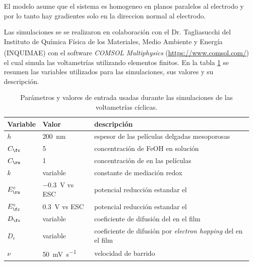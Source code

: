	     El modelo asume que el sistema es homogeneo en planos paralelos al electrodo y por lo tanto hay gradientes solo en la direccion normal al electrodo.   


	 	 Las simulaciones se se realizaron en colaboración con el Dr. Tagliasucchi del Instituto de Química Física de los Materiales, Medio Ambiente y Energía (INQUIMAE) con el software \textit{COMSOL Multiphysics\textsuperscript\textregistered} (\url{https://www.comsol.com/}) el cual simula las voltametrías utilizando elementos finitos. En la tabla \ref{tabla:simulacion} se resumen las variables utilizados para las simulaciones, sus valores y su descripción.
	 	
	    	\begin{table}[ht!]
	 	    \caption[Parámetros de las simulacinoes]{Parámetros y valores de entrada usadas durante las simulaciones de las voltametrías cíclicas.}
	 	    \begin{tabular}{>{\raggedright\arraybackslash}m{1.4cm}>{\centering\arraybackslash}m{2.8cm}>{\raggedright\arraybackslash}m{6.7cm}} 
	 	    \toprule
	 	    Variable  & 	Valor  &   descripción      \\ \midrule
	 	    $h$  	  &    \SI{200}{nm}	& 	   espesor\index{espesor} de las películas delgadas mesoporosas 	    \\ \midrule
	 	    $C_{\fc}$  & \SI{5}{\milli\Molar}  & concentración de FeOH en solución    \\ \midrule
	 	    $C_{\ru}$ & \SI{1}{\milli\Molar}  & concentración de \ru\space en las películas    \\ \midrule
	 	    $k$ 		   & variable 	 & 	constante de mediación\index{mediacion} redox    \\ \midrule
	 	    $E^\circ_{\ru}$  & \SI{-0.3}{\volt} vs ESC & potencial reducción estandar el \ru \\ \midrule
	 	    $E^\circ_{\fc}$  & \SI{0.3}{\volt} vs ESC & potencial reducción estandar el \fc \\ \midrule
	 	    $D_{\fc}$  & variable & coeficiente de difusión\index{difusión} del \fc\space en el film \\ \midrule
	 	    $D_{e}$  & variable & coeficiente de difusión\index{difusión} por \textit{electron hopping }del \ru\space en el film \\ \midrule
	 	    $\nu$    & \SI{50}{\milli\volt\per\second}  &  velocidad de barrido\index{velocidad!de barrido} \\
	 	     \bottomrule
			\end{tabular}
			\label{tabla:simulacion}
			\end{table} 

